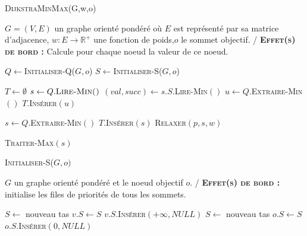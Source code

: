 \begin{algorithm}
	\caption{\textsc {DijkstraMinMax}(G,w,o)}
	 \label{algo:dijkMinMax}
	\begin{algorithmic}[1]
		\REQUIRE $G = (V,E)$ un graphe orienté pondéré où $E$ est représenté par sa matrice d'adjacence, $w: E \rightarrow \mathbb{R}^{+}$ une fonction de poids,$o$ le sommet objectif.
		\ENSURE / \textbf{\textsc{Effet(s) de bord :}} Calcule pour chaque noeud la valeur de ce noeud.
		
		\STATE $Q \leftarrow$\textsc{Initialiser-Q}($G,o$)
		\STATE $S \leftarrow$\textsc{Initialiser-S}($G,o$)
		
		\STATE $T \leftarrow \emptyset$
			\STATE $s \leftarrow Q.\textsc{Lire-Min()}$
			\STATE $(val,succ) \leftarrow s.S.$\textsc{Lire-Min}$()$
					\STATE $u \leftarrow Q.$\textsc{Extraire-Min}$()$
					\STATE $T.$\textsc{Insérer}$(u)$
				\ENDWHILE
			
			
			\ELSE
					\STATE $s \leftarrow Q.$\textsc{Extraire-Min}$()$
					\STATE $T.$\textsc{Insérer}$(s)$
						\STATE \textsc{Relaxer}$(p,s,w)$
					\ENDFOR
				
				
				\ELSE
					\STATE \textsc{Traiter-Max}$(s)$
				\ENDIF
			\ENDIF
		\ENDWHILE
				
			
\end{algorithmic}
		
\end{algorithm}


\begin{algorithm}
	\caption{\textsc {Initialiser-S}($G,o)$}
	 \label{algo:initS}
	\begin{algorithmic}[1]
		\REQUIRE $G$ un graphe orienté pondéré et le noeud objectif $o$.
		\ENSURE / \textbf{\textsc{Effet(s) de bord :}} initialise les files de priorités de tous les sommets.
		
			\STATE $S \leftarrow$ nouveau tas
			\STATE $v.S \leftarrow S$
			\STATE $v.S.$\textsc{Insérer}$(+\infty, NULL)$
		\ENDFOR
			\STATE $S \leftarrow$ nouveau tas
			\STATE $o.S \leftarrow S$
			\STATE $o.S.$\textsc{Insérer}$(0, NULL)$
		\ENDFOR
	
			
\end{algorithmic}
		
\end{algorithm}

